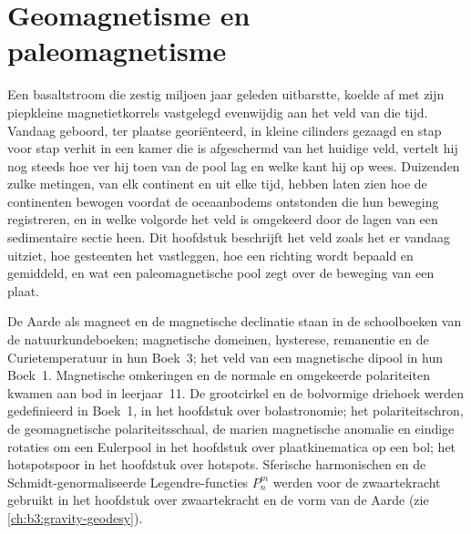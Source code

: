 \chapter{Geomagnetisme en paleomagnetisme}\label{ch:b3:palaeomagnetism}

Een basaltstroom die zestig miljoen jaar geleden uitbarstte, koelde af
met zijn piepkleine magnetietkorrels vastgelegd evenwijdig aan het veld van die tijd. Vandaag geboord, ter plaatse
georiënteerd, in kleine cilinders gezaagd en
stap voor stap verhit in een kamer die is afgeschermd van het huidige veld, vertelt hij nog steeds
hoe ver hij toen van de pool lag en welke kant hij op wees. Duizenden zulke
metingen, van elk continent en uit elke tijd, hebben laten zien hoe de continenten
bewogen voordat de oceaanbodems ontstonden die hun beweging registreren, en in
welke volgorde het veld is omgekeerd door de lagen van een sedimentaire
sectie heen. Dit hoofdstuk beschrijft het veld zoals het er vandaag uitziet, hoe gesteenten
het vastleggen, hoe een richting wordt bepaald en gemiddeld, en wat een paleomagnetische pool
zegt over de beweging van een plaat.

\begin{recall}
De Aarde als magneet en de magnetische declinatie staan in de
schoolboeken van de natuurkundeboeken; magnetische domeinen, hysterese, remanentie en de Curietemperatuur
in hun Boek~3; het veld van een magnetische dipool in hun
Boek~1. Magnetische omkeringen en de normale en omgekeerde polariteiten
kwamen aan bod in leerjaar~11. De grootcirkel en de bolvormige driehoek werden
gedefinieerd in Boek~1, in het hoofdstuk over bolastronomie; het polariteitschron,
de geomagnetische polariteitsschaal, de marien magnetische anomalie en eindige
rotaties om een Eulerpool in het hoofdstuk over plaatkinematica op een bol;
het hotspotspoor in het hoofdstuk over hotspots. Sferische harmonischen en de
Schmidt-genormaliseerde Legendre-functies $P_n^m$ werden voor de zwaartekracht gebruikt in het
hoofdstuk over zwaartekracht en de vorm van de Aarde (zie \cref{ch:b3:gravity-geodesy}).
\end{recall}


